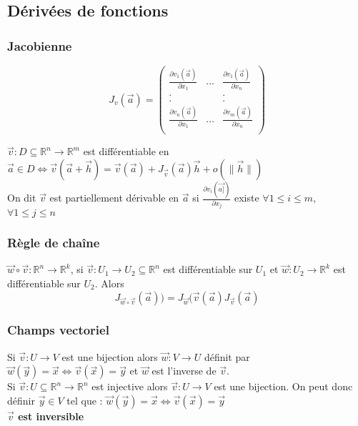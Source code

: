 \documentclass[../main.tex]{subfiles}
\begin{document}
\subsection{Dérivées de fonctions}
\subsubsection{Jacobienne}
\begin{equation}
    J_v (\vec{a}) = \begin{pmatrix}
        \frac{\partial v_1(\vec{a})}{\partial x_1} & \dots & \frac{\partial v_1(\vec{a})}{\partial x_n}\\
        . & &.\\
        .& &.\\
        \frac{\partial v_n(\vec{a})}{\partial x_1} & \dots & \frac{\partial v_m(\vec{a})}{\partial x_n}\\
    \end{pmatrix}
\end{equation}

$\vec{v} : D\subseteq \mathbb{R}^n \rightarrow \mathbb{R}^m$ est différentiable en $\vec{a}\in D \Leftrightarrow \vec{v}(\vec{a}+\vec{h}) = \vec{v}(\vec{a}) + J_{\vec{v}}(\vec{a}) \vec{h} + o(\parallel \vec{h}\parallel)$\\


On dit $\vec{v}$ est partiellement dérivable en $\vec{a}$ si $\frac{\partial v_i (\vec{a]})}{\partial x_j}$ existe $\forall 1\leq i\leq m$, $\forall 1\leq j\leq n$\\

\subsubsection{Règle de chaîne}
$\vec{w} \circ \vec{v} : \mathbb{R}^n\rightarrow \mathbb{R}^k$, si $\vec{v} : U_1\rightarrow U_2 \subseteq\mathbb{R}^n$ est différentiable sur $U_1$ et $\vec{w} : U_2 \rightarrow \mathbb{R}^k$ est différentiable sur $U_2$. Alors \\
\begin{equation}
    J_{\vec{w}\circ \vec{v}} (\vec{a})) = J_{\vec{w}} (\vec{v}(\vec{a}) J_{\vec{v}}(\vec{a})
\end{equation}

\subsubsection{Champs vectoriel}
Si $\vec{v} : U\rightarrow V$ est une bijection alors $\vec{w} : V\rightarrow U$ définit par $\vec{w} (\vec{y}) = \vec{x} \Leftrightarrow \vec{v}(\vec{x}) = \vec{y}$ et $\vec{w}$ est l'inverse de $\vec{v}$.\\
Si $\vec{v} :U \subseteq \mathbb{R}^n \rightarrow \mathbb{R}^n$ est injective alors $\vec{v} :U\rightarrow V$ est une bijection. On peut donc définir $\vec{y} \in V$ tel que : $\vec{w}(\vec{y}) = \vec{x}\Leftrightarrow \vec{v}(\vec{x}) = \vec{y}$\\
\textbf{$\vec{v}$ est inversible}\\
\end{document}
